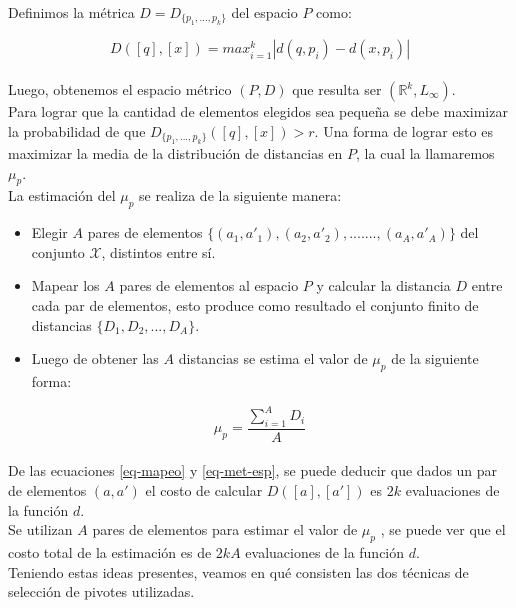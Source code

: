 \noindent Definimos la m\'etrica $D = D_{\{p_1,...,p_k\}}$ del espacio $P$ como:

\begin{equation}
D([q],[x]) = max_{i=1}^k |d(q,p_i) - d(x,p_i)|
\label{eq-met-esp}
\end{equation}
\\

Luego, obtenemos el espacio m\'etrico $(P,D)$ que resulta ser $(\mathbb{R}^k, L_{\infty})$. \\

Para lograr que la cantidad de elementos elegidos sea peque\~na se debe maximizar la probabilidad de que $D_{\{p_1,...,p_k\}}([q],[x]) > r$. Una forma de lograr esto es maximizar la media de la distribuci\'on de distancias en $P$, la cual la llamaremos $\mu_p$.\\
 

\noindent La estimaci\'on del $\mu_p$ se realiza de la siguiente manera:\\

\begin{itemize}
	\item Elegir $A$ pares de elementos $\{(a_1,a'_1),(a_2,a'_2),.......,(a_A,a'_A)\}$ del conjunto $\mathcal{X}$, distintos entre s\'i.
	\item Mapear los $A$ pares de elementos al espacio $P$ y calcular la distancia $D$ entre cada par de elementos, esto produce como resultado el conjunto finito de distancias $\{D_1,D_2,...,D_A\}$.
	\item Luego de obtener las $A$ distancias se estima el valor de $\mu_p$ de la siguiente forma:
\end{itemize}

\begin{equation}
\mu_p = \frac{\sum_{i=1}^A D_i}{A}
\end{equation}
\\

De las ecuaciones \ref{eq-mapeo} y \ref{eq-met-esp}, se puede deducir que dados un par de elementos $(a,a')$ el costo de calcular $D([a],[a'])$ es $2k$ evaluaciones de la funci\'on $d$.\\

Se utilizan $A$ pares de elementos para estimar el valor de $\mu_p$ , se puede ver que el costo total de la estimaci\'on es de $2kA$ evaluaciones de la funci\'on $d$.\\

Teniendo estas ideas presentes, veamos en qu\'e consisten las dos t\'ecnicas de selecci\'on de pivotes utilizadas.\\
 \\
 
